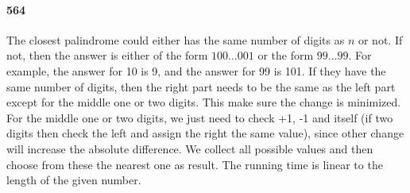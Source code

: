 \documentclass[11pt]{article}
\begin{document}
\paragraph{564}
The closest palindrome could either has the same number of digits as $n$ or not. If not, then the answer is either of the form
$100 \dots 001$ or the form $99\dots99$. For example, the answer for 10 is 9, and the answer for 99 is 101. 
If they have the same number of digits, then the right part needs to be the same as the left part except for the middle one
or two digits. This make sure the change is minimized. For the middle one or two digits, we just need to check +1, -1 and
itself (if two digits then check the left and assign the right the same value), since other change will increase the absolute 
difference. We collect all possible values and then choose from these the nearest one as result. 
The running time is linear to the length of the given number.
\end{document}
